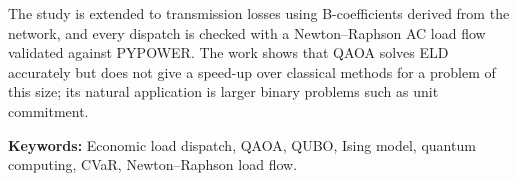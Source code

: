 The study is extended to transmission losses using B-coefficients derived from the network, and every dispatch is checked with a Newton--Raphson AC load flow validated against PYPOWER. The work shows that QAOA solves ELD accurately but does not give a speed-up over classical methods for a problem of this size; its natural application is larger binary problems such as unit commitment.

\vspace{0.5cm}
\noindent\textbf{Keywords:} Economic load dispatch, QAOA, QUBO, Ising model, quantum computing, CVaR, Newton--Raphson load flow.
